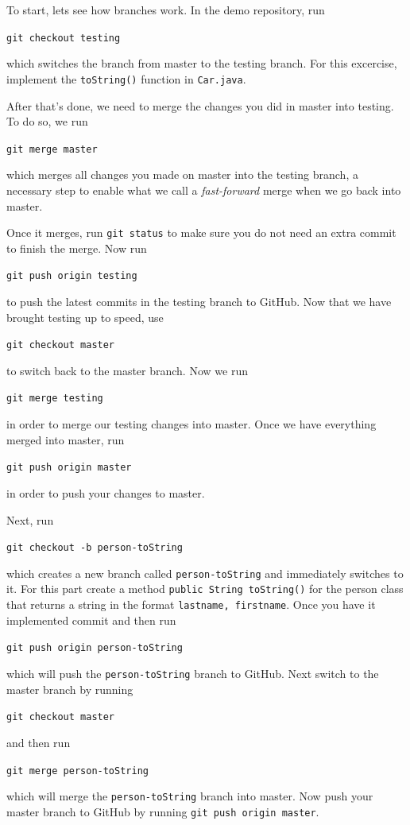 \documentclass[notitlepage]{simple}
\begin{document}
To start, lets see how branches work.
In the demo repository, run
\begin{terminal}
	\verb|git checkout testing|
\end{terminal}
which switches the branch from master to the testing branch.
For this excercise, implement the \verb|toString()| function in \verb|Car.java|.

After that's done, we need to merge the changes you did in master into testing.
To do so, we run
\begin{terminal}
	\verb|git merge master|
\end{terminal}
which merges all changes you made on master into the testing branch, a necessary step to enable what we call a \textit{fast-forward} merge when we go back into master.

Once it merges, run \verb|git status| to make sure you do not need an extra commit to finish the merge.
Now run
\begin{terminal}
	\verb|git push origin testing|
\end{terminal}
to push the latest commits in the testing branch to GitHub.
Now that we have brought testing up to speed, use
\begin{terminal}
	\verb|git checkout master|
\end{terminal}
to switch back to the master branch.
Now we run
\begin{terminal}
	\verb|git merge testing|
\end{terminal}
in order to merge our testing changes into master.
Once we have everything merged into master, run
\begin{terminal}
	\verb|git push origin master|
\end{terminal}
in order to push your changes to master.

Next, run
\begin{terminal}
	\verb|git checkout -b person-toString|
\end{terminal}
which creates a new branch called \verb|person-toString| and immediately switches to it.
For this part create a method \verb|public String toString()| for the person class that returns a string in the format \linebreak\verb|lastname, firstname|.
Once you have it implemented commit and then run
\begin{terminal}
	\verb|git push origin person-toString|
\end{terminal}
which will push the \verb|person-toString| branch to GitHub.
Next switch to the master branch by running
\begin{terminal}
	\verb|git checkout master|
\end{terminal}
and then run
\begin{terminal}
	\verb|git merge person-toString|
\end{terminal}
which will merge the \verb|person-toString| branch into master.
Now push your master branch to GitHub by running \verb|git push origin master|.
\end{document}
